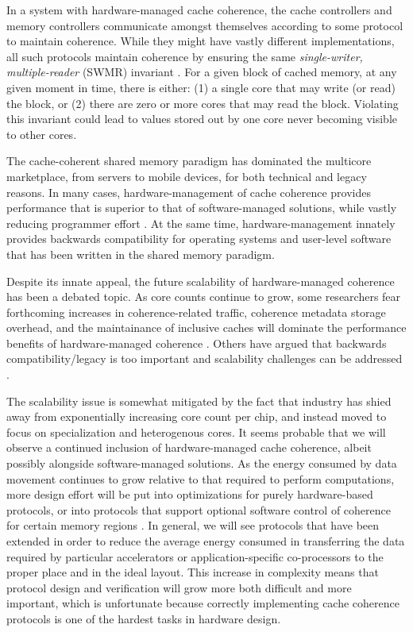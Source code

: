 In a system with hardware-managed cache coherence, the cache controllers and memory controllers
communicate amongst themselves according to some protocol to maintain coherence.
While they might have vastly different implementations, 
all such protocols maintain coherence by ensuring the same {\em single-writer, multiple-reader} (SWMR) invariant \cite{sorin2011primer}. 
For a given block of cached memory, at any given moment in time, there is either: 
(1) a single core that may write (or read) the block, or 
(2) there are zero or more cores that may read the block.
Violating this invariant could lead to values stored out by one core never becoming visible to other cores.

The cache-coherent shared memory paradigm has dominated the multicore marketplace, from servers to mobile devices,
for both technical and legacy reasons.
In many cases, hardware-management of cache coherence provides performance that is superior
to that of software-managed solutions, while vastly reducing programmer effort \cite{leverich-isca07}.
At the same time, hardware-management innately provides backwards compatibility for operating systems and user-level software that has been written in the shared memory paradigm.

Despite its innate appeal, the future scalability of hardware-managed coherence has been a debated topic.
As core counts continue to grow, some researchers fear forthcoming increases in coherence-related traffic, coherence metadata storage overhead, and the maintainance of inclusive caches will dominate the performance benefits of hardware-managed coherence \cite{choi2011denovo, kelm2011cohesion, howard201048}.
Others have argued that backwards compatibility/legacy is too important and scalability challenges can be addressed \cite{martin2012chip}.

The scalability issue is somewhat mitigated by the fact that industry has shied away from exponentially increasing core count per chip, and instead moved to focus on specialization and heterogenous cores.
It seems probable that we will observe a continued inclusion of hardware-managed cache coherence, albeit possibly alongside software-managed solutions.
As the energy consumed by data movement continues to grow relative to that required to perform computations, more design effort will be put into optimizations for purely hardware-based protocols,
or into protocols that support optional software control of coherence for certain memory regions \cite{kelm2011cohesion}.
In general, we will see protocols that have been extended in order to reduce the average energy consumed in transferring the data required by particular accelerators or application-specific co-processors to the proper place and in the ideal layout.
This increase in complexity means that protocol design and verification will grow more both difficult and more important,
which is unfortunate because correctly implementing cache coherence protocols is one of the hardest tasks in hardware design.

